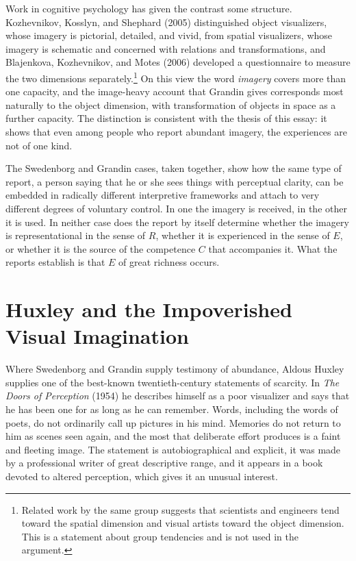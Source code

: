 \documentclass[11pt]{article}
\theoremstyle{remark}
\begin{document}
Work in cognitive psychology has given the contrast some structure. Kozhevnikov, Kosslyn, and Shephard (2005) distinguished object visualizers, whose imagery is pictorial, detailed, and vivid, from spatial visualizers, whose imagery is schematic and concerned with relations and transformations, and Blajenkova, Kozhevnikov, and Motes (2006) developed a questionnaire to measure the two dimensions separately.\footnote{Related work by the same group suggests that scientists and engineers tend toward the spatial dimension and visual artists toward the object dimension. This is a statement about group tendencies and is not used in the argument.} On this view the word \emph{imagery} covers more than one capacity, and the image-heavy account that Grandin gives corresponds most naturally to the object dimension, with transformation of objects in space as a further capacity. The distinction is consistent with the thesis of this essay: it shows that even among people who report abundant imagery, the experiences are not of one kind.

The Swedenborg and Grandin cases, taken together, show how the same type of report, a person saying that he or she sees things with perceptual clarity, can be embedded in radically different interpretive frameworks and attach to very different degrees of voluntary control. In one the imagery is received, in the other it is used. In neither case does the report by itself determine whether the imagery is representational in the sense of $R$, whether it is experienced in the sense of $E$, or whether it is the source of the competence $C$ that accompanies it. What the reports establish is that $E$ of great richness occurs.

\section{Huxley and the Impoverished Visual Imagination}

Where Swedenborg and Grandin supply testimony of abundance, Aldous Huxley supplies one of the best-known twentieth-century statements of scarcity. In \emph{The Doors of Perception} (1954) he describes himself as a poor visualizer and says that he has been one for as long as he can remember. Words, including the words of poets, do not ordinarily call up pictures in his mind. Memories do not return to him as scenes seen again, and the most that deliberate effort produces is a faint and fleeting image. The statement is autobiographical and explicit, it was made by a professional writer of great descriptive range, and it appears in a book devoted to altered perception, which gives it an unusual interest.
\end{document}
